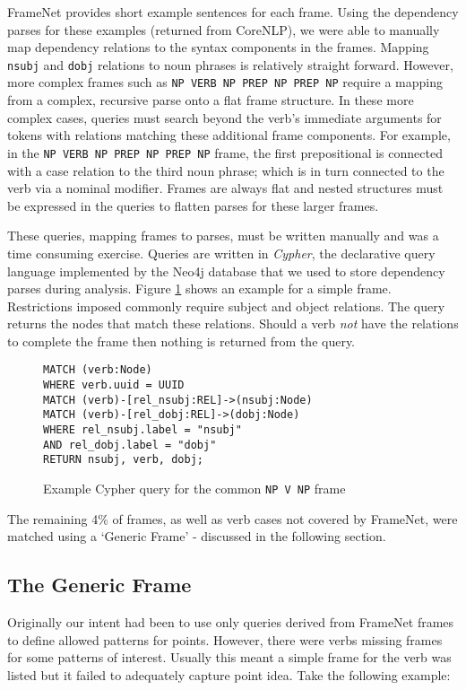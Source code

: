       FrameNet provides short example sentences for each frame. Using the dependency parses for these examples (returned from CoreNLP), we were able to manually map dependency relations to the syntax components in the frames. Mapping \texttt{nsubj} and \texttt{dobj} relations to noun phrases is relatively straight forward. However, more complex frames such as \texttt{NP VERB NP PREP NP PREP NP} require a mapping from a complex, recursive parse onto a flat frame structure. In these more complex cases, queries must search beyond the verb's immediate arguments for tokens with relations matching these additional frame components. For example, in the \texttt{NP VERB NP PREP NP PREP NP} frame, the first prepositional is connected with a case relation to the third noun phrase; which is in turn connected to the verb via a nominal modifier. Frames are always flat and nested structures must be expressed in the queries to flatten parses for these larger frames.

      These queries, mapping frames to parses, must be written manually and was a time consuming exercise. Queries are written in \textit{Cypher}, the declarative query language implemented by the Neo4j database that we used to store dependency parses during analysis. Figure \ref{fig:npvnpquery} shows an example for a simple frame. Restrictions imposed commonly require subject and object relations. The query returns the nodes that match these relations. Should a verb \textit{not} have the relations to complete the frame then nothing is returned from the query.

      \begin{figure}
        \centering
        \caption{Example Cypher query for the common \texttt{NP V NP} frame}

        \begin{verbatim}
MATCH (verb:Node)
WHERE verb.uuid = UUID
MATCH (verb)-[rel_nsubj:REL]->(nsubj:Node)
MATCH (verb)-[rel_dobj:REL]->(dobj:Node)
WHERE rel_nsubj.label = "nsubj"
AND rel_dobj.label = "dobj"
RETURN nsubj, verb, dobj;
        \end{verbatim}
        \label{fig:npvnpquery}
      \end{figure}

      The remaining 4\% of frames, as well as verb cases not covered by FrameNet, were matched using a `Generic Frame' - discussed in the following section.

    \tocless\subsection{The Generic Frame}
      Originally our intent had been to use only queries derived from FrameNet frames to define allowed patterns for points. However, there were verbs missing frames for some patterns of interest. Usually this meant a simple frame for the verb was listed but it failed to adequately capture point idea. Take the following example:

